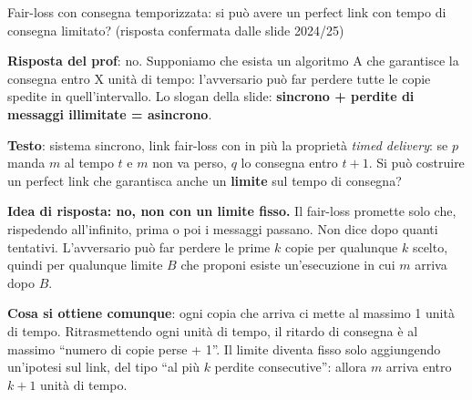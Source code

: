 \begin{approfondimento}{Fair-loss con consegna temporizzata: si può avere un perfect link con
tempo di consegna limitato? (risposta confermata dalle slide 2024/25)}

\textbf{Risposta del prof}: no. Supponiamo che esista un algoritmo A che garantisce la consegna entro X unità di tempo: l'avversario può far perdere tutte le copie spedite in quell'intervallo. Lo slogan della slide: \textbf{sincrono + perdite di messaggi illimitate = asincrono}.

\textbf{Testo}: sistema sincrono, link fair-loss con in più la proprietà \emph{timed delivery}: se \(p\) manda \(m\) al tempo \(t\) e \(m\) non va perso, \(q\) lo consegna entro \(t + 1\). Si può costruire un perfect link che garantisca anche un \textbf{limite} sul tempo di consegna?

\textbf{Idea di risposta: no, non con un limite fisso.} Il fair-loss promette solo che, rispedendo all'infinito, prima o poi i messaggi passano. Non dice dopo quanti tentativi. L'avversario può far perdere le prime \(k\) copie per qualunque \(k\) scelto, quindi per qualunque limite \(B\) che proponi esiste un'esecuzione in cui \(m\) arriva dopo \(B\).

\textbf{Cosa si ottiene comunque}: ogni copia che arriva ci mette al massimo 1 unità di tempo. Ritrasmettendo ogni unità di tempo, il ritardo di consegna è al massimo ``numero di copie perse + 1''. Il limite diventa fisso solo aggiungendo un'ipotesi sul link, del tipo ``al più \(k\) perdite consecutive'': allora \(m\) arriva entro \(k + 1\) unità di tempo.

\end{approfondimento}

